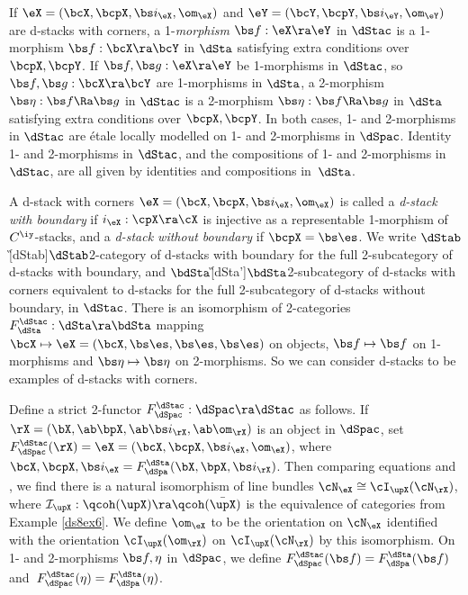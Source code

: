 \documentclass{article}
\begin{document}
If $\eX=(\bcX,\bcpX,\bs i_\eX,\om_\eX)$ and $\eY=(\bcY,\bcpY,\bs
i_\eY,\om_\eY)$ are d-stacks with corners, a 1-{\it morphism\/} $\bs
f:\eX\ra\eY$ in $\dStac$ is a 1-morphism $\bs f:\bcX\ra\bcY$ in
$\dSta$ satisfying extra conditions over $\bcpX,\bcpY$. If $\bs
f,\bs g:\eX\ra\eY$ be 1-morphisms in $\dStac$, so $\bs f,\bs
g:\bcX\ra\bcY$ are 1-morphisms in $\dSta$, a 2-morphism $\bs\eta:\bs
f\Ra\bs g$ in $\dStac$ is a 2-morphism $\bs\eta:\bs f\Ra\bs g$ in
$\dSta$ satisfying extra conditions over $\bcpX,\bcpY$. In both
cases, 1- and 2-morphisms in $\dStac$ are \'etale locally modelled
on 1- and 2-morphisms in $\dSpac$. Identity 1- and 2-morphisms in
$\dStac$, and the compositions of 1- and 2-morphisms in $\dStac$,
are all given by identities and compositions
in~$\dSta$.

A d-stack with corners $\eX=(\bcX,\bcpX,\bs i_\eX,\om_\eX)$ is
called a {\it d-stack with boundary\/} if
$i_\eX:\cpX\ra\cX$ is injective as a representable 1-morphism of
$C^\iy$-stacks, and a {\it d-stack without boundary\/} if
$\bcpX=\bs\es$. We write $\dStab$\G[dStab]{$\dStab$}{2-category of
d-stacks with boundary} for the full 2-subcategory of d-stacks with
boundary, and $\bdSta$\G[dSta']{$\bdSta$}{2-subcategory of d-stacks
with corners equivalent to d-stacks} for the full 2-subcategory of
d-stacks without boundary, in $\dStac$. There is an isomorphism of
2-categories $F_\dSta^\dStac:\dSta\ra\bdSta$ mapping
$\bcX\mapsto\eX=(\bcX,\bs\es,\bs\es,\bs\es)$ on objects, $\bs
f\mapsto\bs f$ on 1-morphisms and $\bs\eta\mapsto\bs\eta$ on
2-morphisms. So we can consider d-stacks to be examples of d-stacks
with corners.

Define a strict 2-functor
$F_\dSpac^\dStac:\dSpac\ra\dStac$ as follows. If
$\rX=(\bX,\ab\bpX,\ab\bs i_\rX,\ab\om_\rX)$ is an object in
$\dSpac$, set $F_\dSpac^\dStac(\rX)=\eX=(\bcX,\bcpX,\bs
i_\eX,\om_\eX)$, where $\bcX,\bcpX,\bs i_\eX=F_\dSpa^\dSta
(\bX,\bpX,\bs i_\rX)$. Then comparing equations  and
, we find there is a natural isomorphism of line bundles
$\cN_\eX\cong\cI_\upX(\cN_\rX)$, where ${\cal I}_\upX:\qcoh(\upX)
\ra\qcoh(\bar\upX)$ is the equivalence of categories from Example
\ref{ds8ex6}. We define $\om_\eX$ to be the orientation on $\cN_\eX$
identified with the orientation $\cI_\upX(\om_\rX)$ on
$\cI_\upX(\cN_\rX)$ by this isomorphism. On 1- and 2-morphisms $\bs
f,\eta$ in $\dSpac$, we define $F_\dSpac^\dStac(\bs
f)=F_\dSpa^\dSta(\bs f)$ and~$F_\dSpac^\dStac(\eta)=
F_\dSpa^\dSta(\eta)$.
\end{document}
